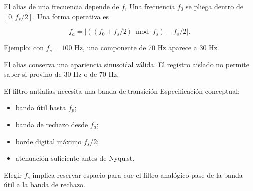 \documentclass[
  ignorenonframetext,
  aspectratio=169,
  spanish,
]{beamer}
\providecommand{\faExclamation}{\faIcon{exclamation}}
\providecommand{\tightlist}{%
  \setlength{\itemsep}{0pt}\setlength{\parskip}{0pt}}
\begin{document}
\begin{frame}{El alias de una frecuencia depende de \(f_s\)}
  \protect{}\label{el-alias-de-una-frecuencia-depende-de-f_s}
  Una frecuencia \(f_0\) se pliega dentro de \([0,f_s/2]\). Una forma
  operativa es

  \[f_a=\left|\left((f_0+f_s/2)\bmod f_s\right)-f_s/2\right|.\]

  Ejemplo: con \(f_s=100\) Hz, una componente de 70 Hz aparece a 30 Hz.

  \begin{tcolorbox}[enhanced jigsaw, arc=.35mm, bottomrule=.15mm, bottomtitle=1mm, breakable, colback=white, colbacktitle=quarto-callout-warning-color!10!white, colframe=quarto-callout-warning-color-frame, coltitle=black, left=2mm, leftrule=.75mm, opacityback=0, opacitybacktitle=0.6, rightrule=.15mm, title=\textcolor{quarto-callout-warning-color}{\faExclamationTriangle}\hspace{0.5em}{Advertencia}, titlerule=0mm, toprule=.15mm, toptitle=1mm]

    El alias conserva una apariencia sinusoidal válida. El registro aislado
    no permite saber si provino de 30 Hz o de 70 Hz.

  \end{tcolorbox}
\end{frame}

\begin{frame}{El filtro antialias necesita una banda de transición}
  \protect{}\label{el-filtro-antialias-necesita-una-banda-de-transiciuxf3n}
  Especificación conceptual:

  \begin{itemize}
    \tightlist
    \item
          banda útil hasta \(f_p\);
    \item
          banda de rechazo desde \(f_a\);
    \item
          borde digital máximo \(f_s/2\);
    \item
          atenuación suficiente antes de Nyquist.
  \end{itemize}

  \begin{tcolorbox}[enhanced jigsaw, arc=.35mm, bottomrule=.15mm, bottomtitle=1mm, breakable, colback=white, colbacktitle=quarto-callout-important-color!10!white, colframe=quarto-callout-important-color-frame, coltitle=black, left=2mm, leftrule=.75mm, opacityback=0, opacitybacktitle=0.6, rightrule=.15mm, title=\textcolor{quarto-callout-important-color}{\faExclamation}\hspace{0.5em}{Importante}, titlerule=0mm, toprule=.15mm, toptitle=1mm]

    Elegir \(f_s\) implica reservar espacio para que el filtro analógico
    pase de la banda útil a la banda de rechazo.

  \end{tcolorbox}
\end{frame}
\end{document}
